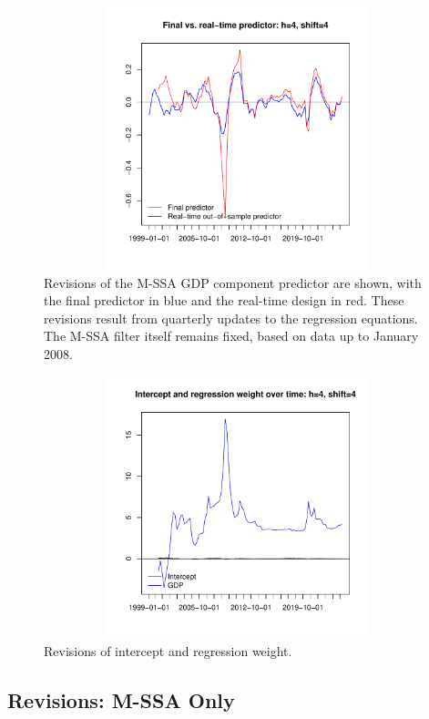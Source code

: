 \documentclass[a4paper]{article}
\begin{document}
\begin{figure}[H]\begin{center}\includegraphics[height=3in, width=4.5in]{./Figures/revisions1.pdf}\caption{Revisions of the M-SSA GDP component predictor are shown, with the final predictor in blue and the real-time design in red. These revisions result from quarterly updates to the regression equations. The M-SSA filter itself remains fixed, based on data up to January 2008.\label{revisions1}}\end{center}\end{figure}\begin{figure}[H]\begin{center}\includegraphics[height=3in, width=4.5in]{./Figures/revisions2.pdf}\caption{Revisions of intercept and regression weight.\label{revisions2}}\end{center}\end{figure}

\subsection{Revisions: M-SSA Only}
\end{document}
